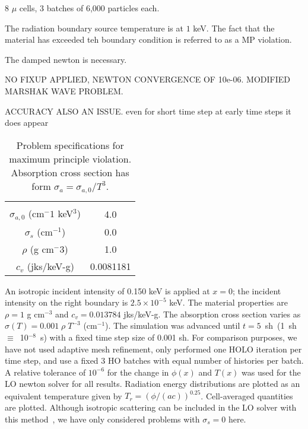8 $\mu$ cells, 3 batches of 6,000 particles each.

The radiation boundary source temperature is at $1$ keV. The fact that the material
has exceeded teh boundary condition is referred to as a MP violation.


The damped newton is necessary.

NO FIXUP APPLIED, NEWTON CONVERGENCE OF 10e-06.  MODIFIED MARSHAK WAVE PROBLEM.

ACCURACY ALSO AN ISSUE.  even for short time step at early time steps it does appear

\begin{table}[H]
        \caption{\label{tab:mpv_prob}Problem specifications for maximum principle
        violation. Absorption cross section has form $\sigma_a = \sigma_{a,0}/T^3$.}
\centering
        \begin{tabular}{|c|c|} \hline \\
            $\sigma_{a,0}$ (cm$^-1$ keV$^3$)  & 4.0  \\
            $\sigma_s$ (cm$^{-1}$) & 0.0 \\
            $\rho$ (g cm$^-3$) & 1.0  \\
            $c_v$ (jks/keV-g) & 0.0081181  \\ 
        \end{tabular}
\end{table}



   An isotropic incident intensity of 0.150 keV is applied
at $x=0$; the incident intensity on the right boundary is $2.5\times10^{-5}$ keV.
The material properties are $\rho = 1$ g cm$^{-3}$ and $c_v = 0.013784$ jks/keV-g. The
absorption cross section varies as $\sigma(T) = 0.001\;\rho\; T^{-3}$ (cm$^{-1}$).
The simulation was advanced until $t=5$~sh~(1~sh~$\equiv$~10$^{-8}$~s) with a fixed time step size of 0.001 sh. For comparison purposes, we
have not used adaptive mesh
refinement, only performed one HOLO iteration per time
step, and use a fixed 3 HO batches with equal number of histories per batch. A
relative tolerance of $10^{-6}$ for the change in $\phi(x)$ and $T(x)$ was used for
the LO newton solver for all results. Radiation energy
distributions are plotted as an equivalent temperature given by
$T_r=(\phi/(ac))^{0.25}$.  Cell-averaged quantities are plotted.
Although isotropic scattering can be included in the LO solver with this method~\cite{ans_2014}, we have only
considered problems with $\sigma_s = 0$ here.  
